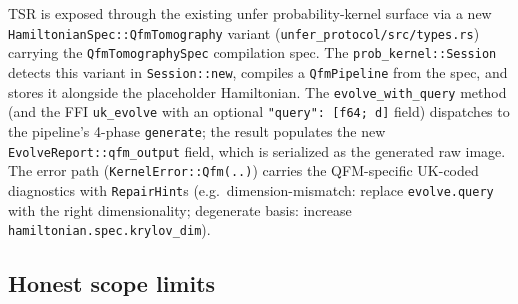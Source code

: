 \documentclass[11pt, a4paper]{article}
\begin{document}
TSR is exposed through the existing unfer probability-kernel surface via a
new \texttt{HamiltonianSpec::QfmTomography} variant
(\texttt{unfer\_protocol/src/types.rs}) carrying the
\texttt{QfmTomographySpec} compilation spec. The
\texttt{prob\_kernel::Session} detects this variant in
\texttt{Session::new}, compiles a \texttt{QfmPipeline} from the spec, and
stores it alongside the placeholder Hamiltonian. The \texttt{evolve\_with\_query}
method (and the FFI \texttt{uk\_evolve} with an optional
\texttt{"query": [f64; d]} field) dispatches to the pipeline's 4-phase
\texttt{generate}; the result populates the new
\texttt{EvolveReport::qfm\_output} field, which is serialized as the
generated raw image. The error path (\texttt{KernelError::Qfm(..)}) carries
the QFM-specific UK-coded diagnostics with \texttt{RepairHint}s (e.g.\
dimension-mismatch: replace \texttt{evolve.query} with the right
dimensionality; degenerate basis: increase \texttt{hamiltonian.spec.krylov\_dim}).

\subsection{Honest scope limits}
\end{document}
